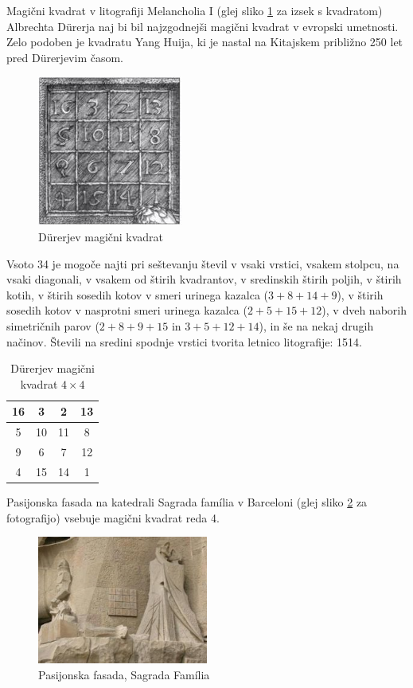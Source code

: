 \documentclass[a4paper,12pt]{article}
\theoremstyle{definition}
\theoremstyle{plain}
\begin{document}
Magični kvadrat v litografiji Melancholia I (glej sliko \ref{fig:durer}
za izsek s kvadratom) Albrechta Dürerja naj bi bil najzgodnejši magični kvadrat
v evropski umetnosti. Zelo podoben je kvadratu Yang Huija, ki je nastal na Kitajskem
približno 250 let pred Dürerjevim časom. %

\begin{figure}[!ht]
   \centering
   \includegraphics[scale=1.5]{durer.png} 
   \caption{Dürerjev magični kvadrat}
   \label{fig:durer} 
\end{figure}
Vsoto 34 je mogoče najti pri seštevanju števil v vsaki vrstici, vsakem stolpcu,
na vsaki diagonali, v vsakem od štirih kvadrantov, v sredinskih štirih poljih,
v štirih kotih, v štirih sosedih kotov v smeri urinega kazalca ($3+8+14+9$), v
štirih sosedih kotov v nasprotni smeri urinega kazalca ($2+5+15+12$), v dveh naborih
simetričnih parov ($2+8+9+15$ in $3+5+12+14$), in še na nekaj drugih načinov.
Števili na sredini spodnje vrstici tvorita letnico litografije: 1514.

\begin{table}[!ht]
   \centering
   \caption{Dürerjev magični kvadrat $4\times 4$}
   \label{table:durer}
   \begin{tabular}{|c|c|c|c|}
       \hline
      16 &  3 &  2 & 13 \\\hline
       5 & 10 & 11 &  8 \\\hline
       9 &  6 &  7 & 12 \\\hline
       4 & 15 & 14 &  1 \\\hline
   \end{tabular}
\end{table}

Pasijonska fasada na katedrali Sagrada família v Barceloni
(glej sliko \ref{fig:sagrada} za fotografijo) vsebuje magični kvadrat reda 4.

\begin{figure}[!ht]
   \centering
   \includegraphics[width=0.5\textwidth]{sagrada.png} %
   \caption{Pasijonska fasada, Sagrada Família}
   \label{fig:sagrada}
\end{figure}
\end{document}
